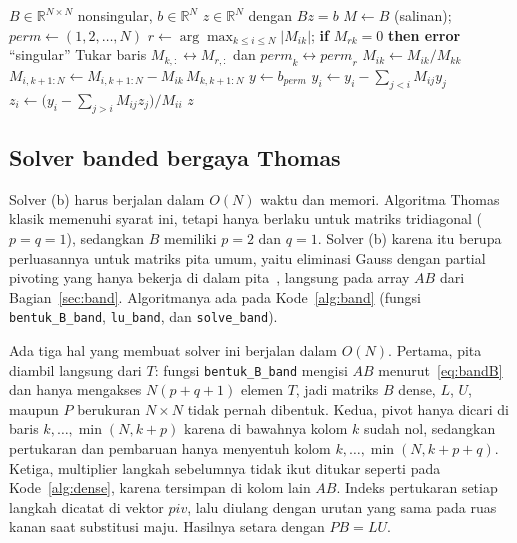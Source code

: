 \documentclass[12pt,a4paper]{article}
\newcommand{\R}{\mathbb{R}}
\numberwithin{equation}{section}
\begin{document}
\begin{algorithm}[H]
\caption{LU dense dengan \emph{partial pivoting} dan penyelesaian $Bz=b$}
\label{alg:dense}
\begin{algorithmic}[1]
\Require $B\in\R^{N\times N}$ nonsingular, $b\in\R^N$
\Ensure $z\in\R^N$ dengan $Bz=b$
\State $M\gets B$ (salinan); $\mathit{perm}\gets(1,2,\dots,N)$
  \State $r\gets\arg\max_{k\le i\le N}\lvert M_{ik}\rvert$; \textbf{if} $M_{rk}=0$ \textbf{then error} ``singular''
  \State Tukar baris $M_{k,:}\leftrightarrow M_{r,:}$ dan $\mathit{perm}_k\leftrightarrow\mathit{perm}_r$
    \State $M_{ik}\gets M_{ik}/M_{kk}$ 
    \State $M_{i,k+1:N}\gets M_{i,k+1:N}-M_{ik}\,M_{k,k+1:N}$
  \EndFor
\EndFor
\State $y\gets b_{\mathit{perm}}$ 
 
  \State $y_i\gets y_i-\sum_{j<i}M_{ij}y_j$
\EndFor
{} 
  \State $z_i\gets\bigl(y_i-\sum_{j>i}M_{ij}z_j\bigr)/M_{ii}$
\EndFor
\State \Return $z$
\end{algorithmic}
\end{algorithm}

\subsection{Solver banded bergaya Thomas}
Solver (b) harus berjalan dalam $O(N)$ waktu dan memori. Algoritma Thomas klasik memenuhi syarat ini, tetapi hanya
berlaku untuk matriks tridiagonal ($p=q=1$), sedangkan $B$ memiliki $p=2$ dan $q=1$. Solver (b) karena itu berupa
perluasannya untuk matriks pita umum, yaitu eliminasi Gauss dengan partial pivoting yang hanya bekerja di dalam
pita~\cite{golub}, langsung pada array $AB$ dari Bagian~\ref{sec:band}. Algoritmanya ada pada Kode~\ref{alg:band} (fungsi \texttt{bentuk\_B\_band},
\texttt{lu\_band}, dan \texttt{solve\_band}).

Ada tiga hal yang membuat solver ini berjalan dalam $O(N)$. Pertama, pita diambil langsung dari $T$: fungsi
\texttt{bentuk\_B\_band} mengisi $AB$ menurut~\eqref{eq:bandB} dan hanya mengakses $N(p+q+1)$ elemen $T$, jadi
matriks $B$ dense, $L$, $U$, maupun $P$ berukuran $N\times N$ tidak pernah dibentuk. Kedua, pivot hanya dicari di
baris $k,\dots,\min(N,k+p)$ karena di bawahnya kolom $k$ sudah nol, sedangkan pertukaran dan pembaruan hanya
menyentuh kolom $k,\dots,\min(N,k+p+q)$. Ketiga, multiplier langkah sebelumnya tidak ikut ditukar seperti pada
Kode~\ref{alg:dense}, karena tersimpan di kolom lain $AB$. Indeks pertukaran setiap langkah dicatat di vektor
$\mathit{piv}$, lalu diulang dengan urutan yang sama pada ruas kanan saat substitusi maju. Hasilnya setara dengan
$PB=LU$.
\end{document}
